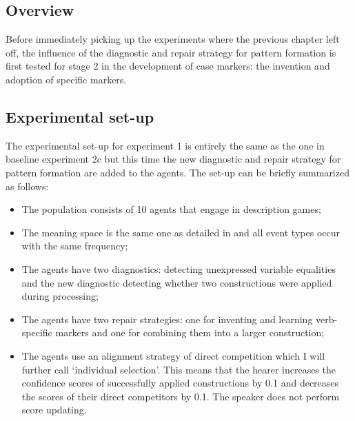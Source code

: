 \subsection{Overview}
Before immediately picking up the experiments where the previous chapter left off, the influence of the diagnostic and repair strategy for pattern formation is first tested for stage 2 in the development of case markers: the invention and adoption of specific markers.

\subsection{Experimental set-up}

The experimental set-up for experiment 1 is entirely the same as the one in baseline experiment 2c but this time the new diagnostic and repair strategy for pattern formation are added to the agents. The set-up can be briefly summarized as follows:

\begin{itemize}
\item The population consists of 10 agents that engage in description games;
\item The meaning space is the same one as detailed in  and all event types occur with the same frequency;
\item The agents have two diagnostics: detecting unexpressed variable equalities and the new diagnostic detecting whether two constructions were applied during processing;
\item The agents have two repair strategies: one for inventing and learning verb-specific markers and one for combining them into a larger construction;
\item The agents use an alignment strategy of direct competition which I will further call `individual selection'. This means that the hearer increases the confidence scores of successfully applied constructions by 0.1 and decreases the scores of their direct competitors by 0.1. The speaker does not perform score updating.
\end{itemize}

